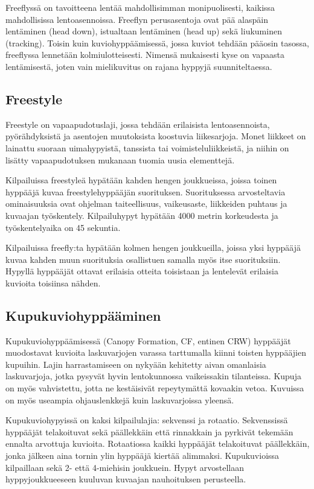Freeflyssä on tavoitteena lentää mahdollisimman monipuolisesti, kaikissa mahdollisissa lentoasennoissa. Freeflyn perusasentoja ovat pää alaspäin lentäminen (head down), istualtaan lentäminen (head up) sekä liukuminen (tracking). Toisin kuin kuviohyppäämisessä, jossa kuviot tehdään pääosin tasossa, freeflyssa lennetään kolmiulotteisesti. Nimensä mukaisesti kyse on vapaasta lentämisestä, joten vain mielikuvitus on rajana hyppyjä suunniteltaessa. 

\subsection{ Freestyle }
\label{erikoishypyt-freestyle}


Freestyle on vapaapudotuslaji, jossa tehdään erilaisista lentoasennoista, pyörähdyksistä ja asentojen muutoksista koostuvia liikesarjoja. Monet liikkeet on lainattu suoraan uimahypyistä, tanssista tai voimisteluliikkeistä, ja niihin on lisätty vapaapudotuksen mukanaan tuomia uusia elementtejä. 


Kilpailuissa freestyleä hypätään kahden hengen joukkueissa, joissa toinen hyppääjä kuvaa freestylehyppääjän suorituksen. Suorituksessa arvosteltavia ominaisuuksia ovat ohjelman taiteellisuus, vaikeusaste, liikkeiden puhtaus ja kuvaajan työskentely. Kilpailuhypyt hypätään 4000 metrin korkeudesta ja työskentelyaika on 45 sekuntia. 


Kilpailuissa freefly:ta hypätään kolmen hengen joukkueilla, joissa yksi hyppääjä kuvaa kahden muun suorituksia osallistuen samalla myös itse suorituksiin. Hypyllä hyppääjät ottavat erilaisia otteita toisistaan ja lentelevät erilaisia kuvioita toisiinsa nähden. 

\subsection{ Kupukuviohyppääminen }
\label{erikoishypyt-kupukuviohyppaaminen}


Kupukuviohyppäämisessä (Canopy Formation, CF, entinen CRW) hyppääjät muodostavat kuvioita laskuvarjojen varassa tarttumalla kiinni toisten hyppääjien kupuihin. Lajin harrastamiseen on nykyään kehitetty aivan omanlaisia laskuvarjoja, jotka pysyvät hyvin lentokunnossa vaikeissakin tilanteissa. Kupuja on myös vahvistettu, jotta ne kestäisivät repeytymättä kovaakin vetoa. Kuvuissa on myös useampia ohjauslenkkejä kuin laskuvarjoissa yleensä. 


Kupukuviohypyissä on kaksi kilpailulajia: sekvenssi ja rotaatio. Sekvenssissä hyppääjät telakoituvat sekä päällekkäin että rinnakkain ja pyrkivät tekemään ennalta arvottuja kuvioita. Rotaatiossa kaikki hyppääjät telakoituvat päällekkäin, jonka jälkeen aina tornin ylin hyppääjä kiertää alimmaksi. Kupukuvioissa kilpaillaan sekä 2- että 4-miehisin joukkuein. Hypyt arvostellaan hyppyjoukkueeseen kuuluvan kuvaajan nauhoituksen perusteella. 

